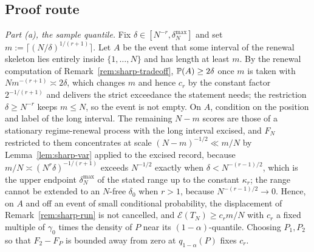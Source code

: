 \documentclass[../../../main.tex]{subfiles}
\begin{document}
\subsection{Proof route}

\begin{route}
\emph{Part (a), the sample quantile.} Fix $\delta\in[N^{-r},\delta^{\max}_N]$ and set $m:=\lceil(N/\delta)^{1/(r+1)}\rceil$. Let $A$ be the event that some interval of the renewal skeleton lies entirely inside $\{1,\dots,N\}$ and has length at least $m$. By the renewal computation of Remark~\ref{rem:sharp-tradeoff}, $\mathbb{P}(A)\ge2\delta$ once $m$ is taken with $Nm^{-(r+1)}\asymp2\delta$, which changes $m$ and hence $c_r$ by the constant factor $2^{-1/(r+1)}$ and delivers the strict exceedance the statement needs; the restriction $\delta\ge N^{-r}$ keeps $m\le N$, so the event is not empty. On $A$, condition on the position and label of the long interval. The remaining $N-m$ scores are those of a stationary regime-renewal process with the long interval excised, and $F_N$ restricted to them concentrates at scale $(N-m)^{-1/2}\ll m/N$ by Lemma~\ref{lem:sharp-var} applied to the excised record, because $m/N\asymp(N^r\delta)^{-1/(r+1)}$ exceeds $N^{-1/2}$ exactly when $\delta<N^{-(r-1)/2}$, which is the upper endpoint $\delta^{\max}_N$ of the stated range up to the constant $\kappa_r$; the range cannot be extended to an $N$-free $\delta_0$ when $r>1$, because $N^{-(r-1)/2}\to0$. Hence, on $A$ and off an event of small conditional probability, the displacement of Remark~\ref{rem:sharp-run} is not cancelled, and $\mathcal E(T_N)\ge c_r m/N$ with $c_r$ a fixed multiple of $\gamma_0$ times the density of $P$ near its $(1-\alpha)$-quantile. Choosing $P_1,P_2$ so that $F_2-F_P$ is bounded away from zero at $q_{1-\alpha}(P)$ fixes $c_r$.


\end{route}
\end{document}
